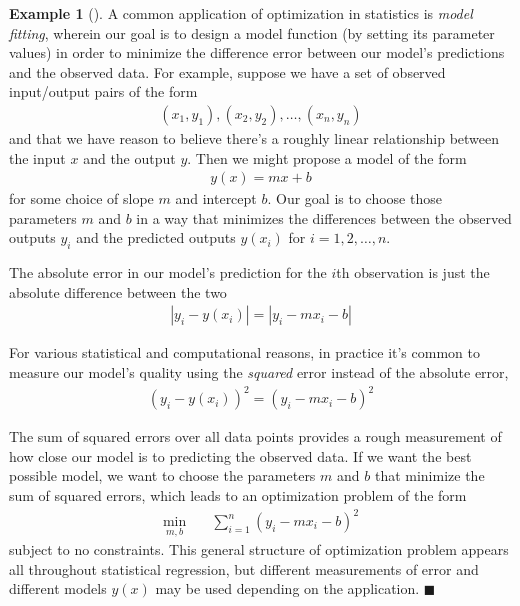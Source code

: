 \documentclass[11pt]{article}
\theoremstyle{definition} %
\newtheorem{ex}{Example}[section] %
\newenvironment{example}[1][]{\begin{ex}[#1]}{\hfill$\blacksquare$\end{ex}} %
\begin{document}
\begin{example}
\label{ex:leastsquares}
	A common application of optimization in statistics is \textit{model fitting}, wherein our goal is to design a model function (by setting its parameter values) in order to minimize the difference error between our model's predictions and the observed data. For example, suppose we have a set of observed input/output pairs of the form
	\begin{align*}
		(x_1,y_1), (x_2,y_2), \dots, (x_n,y_n)
	\end{align*}
	and that we have reason to believe there's a roughly linear relationship between the input $x$ and the output $y$. Then we might propose a model of the form
	\begin{align*}
		y(x) = mx + b
	\end{align*}
	for some choice of slope $m$ and intercept $b$. Our goal is to choose those parameters $m$ and $b$ in a way that minimizes the differences between the observed outputs $y_i$ and the predicted outputs $y(x_i)$ for $i=1,2,\dots,n$.
	
	The absolute error in our model's prediction for the $i$th observation is just the absolute difference between the two
	\begin{align*}
		|y_i - y(x_i)| = |y_i - mx_i - b|
	\end{align*}
	
	For various statistical and computational reasons, in practice it's common to measure our model's quality using the \textit{squared} error instead of the absolute error,
	\begin{align*}
		(y_i - y(x_i))^2 = (y_i - mx_i - b)^2
	\end{align*}
	
	The sum of squared errors over all data points provides a rough measurement of how close our model is to predicting the observed data. If we want the best possible model, we want to choose the parameters $m$ and $b$ that minimize the sum of squared errors, which leads to an optimization problem of the form
	\begin{align*}
		\min_{m,b} \quad& \sum_{i=1}^n (y_i - mx_i - b)^2
	\end{align*}
	subject to no constraints. This general structure of optimization problem appears all throughout statistical regression, but different measurements of error and different models $y(x)$ may be used depending on the application.
\end{example}
\end{document}
